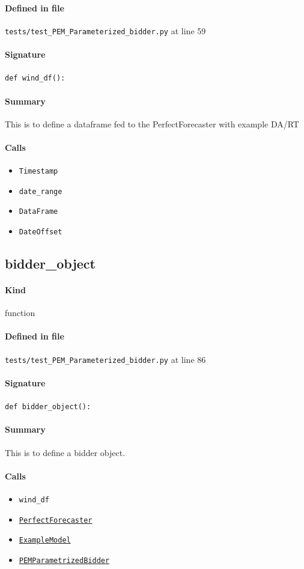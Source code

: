 \documentclass[11pt]{report}
\begin{document}
\paragraph{Defined in file} \texttt{tests/test\_PEM\_Parameterized\_bidder.py} at line 59
\paragraph{Signature} \texttt{def wind\_df():}
\paragraph{Summary} This is to define a dataframe fed to the PerfectForecaster with example DA/RT
\paragraph{Calls}
\begin{itemize}[leftmargin=*]
  \item \texttt{Timestamp}
  \item \texttt{date\_range}
  \item \texttt{DataFrame}
  \item \texttt{DateOffset}
\end{itemize}
\subsection{bidder\_object}
\label{def:tests-test_PEM_Parameterized_bidder.py:bidder_object:L86}
\paragraph{Kind} function
\paragraph{Defined in file} \texttt{tests/test\_PEM\_Parameterized\_bidder.py} at line 86
\paragraph{Signature} \texttt{def bidder\_object():}
\paragraph{Summary} This is to define a bidder object.
\paragraph{Calls}
\begin{itemize}[leftmargin=*]
  \item \texttt{wind\_df}
  \item \hyperref[def:forecaster.py:PerfectForecaster:L686]{\texttt{PerfectForecaster}}
  \item \hyperref[def:tests-util.py:ExampleModel:L25]{\texttt{ExampleModel}}
  \item \hyperref[def:bidder.py:PEMParametrizedBidder:L1502]{\texttt{PEMParametrizedBidder}}
\end{itemize}
\end{document}
